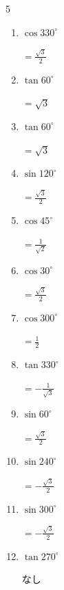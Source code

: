 \begin{multicols}{5}
\begin{enumerate}
        $\displaystyle =-\frac{1}{2}$

  \item $\displaystyle \cos{330^\circ}$

        $\displaystyle =\frac{\sqrt{3}}{2}$

  \item $\displaystyle \tan{60^\circ}$

        $\displaystyle =\sqrt{3}$

  \item $\displaystyle \tan{60^\circ}$

        $\displaystyle =\sqrt{3}$

  \item $\displaystyle \sin{120^\circ}$

        $\displaystyle =\frac{\sqrt{3}}{2}$

\columnbreak %

\resetques

  \item $\displaystyle \cos{45^\circ}$

        $\displaystyle =\frac{1}{\sqrt{2}}$

  \item $\displaystyle \cos{30^\circ}$

        $\displaystyle =\frac{\sqrt{3}}{2}$

  \item $\displaystyle \cos{300^\circ}$

        $\displaystyle =\frac{1}{2}$

  \item $\displaystyle \tan{330^\circ}$

        $\displaystyle =-\frac{1}{\sqrt{3}}$

  \item $\displaystyle \sin{60^\circ}$

        $\displaystyle =\frac{\sqrt{3}}{2}$

  \item $\displaystyle \sin{240^\circ}$

        $\displaystyle =-\frac{\sqrt{3}}{2}$

  \item $\displaystyle \sin{300^\circ}$

        $\displaystyle =-\frac{\sqrt{3}}{2}$

  \item $\displaystyle \tan{270^\circ}$

        $\displaystyle なし$


\end{enumerate}
\end{multicols}
